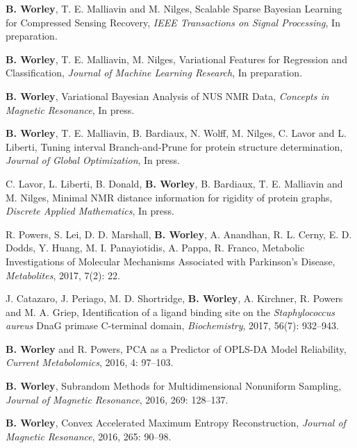 \documentclass[letterpaper]{article}
\renewenvironment{itemize}{
  \begin{list}{}{
    \setlength{\leftmargin}{1.5em}
  }
}{
  \end{list}
}
\begin{document}
\begin{itemize}
 \item \textbf{B. Worley}, T. E. Malliavin and M. Nilges,
  Scalable Sparse Bayesian Learning for Compressed Sensing Recovery,
  \emph{IEEE Transactions on Signal Processing},
  In preparation.

 \item \textbf{B. Worley}, T. E. Malliavin, M. Nilges,
  Variational Features for Regression and Classification,
  \emph{Journal of Machine Learning Research},
  In preparation.

 \item \textbf{B. Worley},
  Variational Bayesian Analysis of NUS NMR Data,
  \emph{Concepts in Magnetic Resonance},
  In press.

 \item \textbf{B. Worley}, T. E. Malliavin, B. Bardiaux, N. Wolff,
  M. Nilges, C. Lavor and L. Liberti, Tuning interval Branch-and-Prune
  for protein structure determination,
  \emph{Journal of Global Optimization},
  In press.

 \item C. Lavor, L. Liberti, B. Donald, \textbf{B. Worley},
  B. Bardiaux, T. E. Malliavin and M. Nilges, Minimal NMR distance
  information for rigidity of protein graphs,
  \emph{Discrete Applied Mathematics},
  In press.

 \item R. Powers, S. Lei, D. D. Marshall, \textbf{B. Worley}, A. Anandhan,
  R. L. Cerny, E. D. Dodds, Y. Huang, M. I. Panayiotidis, A. Pappa,
  R. Franco, Metabolic Investigations of Molecular Mechanisms
  Associated with Parkinson's Disease,
  \emph{Metabolites},
  2017, 7(2): 22.

 \item J. Catazaro, J. Periago, M. D. Shortridge, \textbf{B. Worley},
  A. Kirchner, R. Powers and M. A. Griep,
  Identification of a ligand binding site on the
  \emph{Staphylococcus aureus} DnaG primase C-terminal domain,
  \emph{Biochemistry}, 2017, 56(7): 932--943.

 \item \textbf{B. Worley} and R. Powers,
  PCA as a Predictor of OPLS-DA Model Reliability,
  \emph{Current Metabolomics},
  2016, 4: 97--103.

 \item \textbf{B. Worley},
  Subrandom Methods for Multidimensional Nonuniform Sampling,
  \emph{Journal of Magnetic Resonance},
  2016, 269: 128--137.

 \item \textbf{B. Worley},
  Convex Accelerated Maximum Entropy Reconstruction,
  \emph{Journal of Magnetic Resonance},
  2016, 265: 90--98.


\end{itemize}
\end{document}

